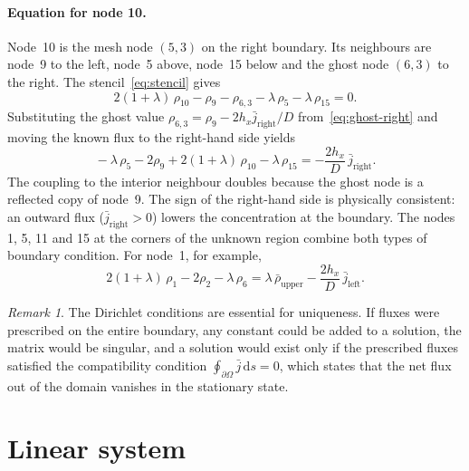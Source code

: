 \documentclass[11pt,a4paper]{article}
\numberwithin{equation}{section}
\theoremstyle{definition}
\theoremstyle{remark}
\newtheorem{remark}{Remark}[section]
\newcommand{\rhoUpper}{\bar{\rho}_{\mathrm{upper}}}
\newcommand{\jleft}{\bar{j}_{\mathrm{left}}}
\newcommand{\jright}{\bar{j}_{\mathrm{right}}}
\begin{document}
\paragraph{Equation for node 10.} Node~10 is the mesh node $(5,3)$ on the right boundary.
Its neighbours are node~9 to the left, node~5 above, node~15 below and the ghost node
$(6,3)$ to the right. The stencil~\eqref{eq:stencil} gives
\begin{equation}\label{eq:node10-raw}
  2(1 + \lambda)\,\rho_{10} - \rho_9 - \rho_{6,3} - \lambda\,\rho_5 - \lambda\,\rho_{15} = 0.
\end{equation}
Substituting the ghost value $\rho_{6,3} = \rho_9 - 2h_x\jright/D$
from~\eqref{eq:ghost-right} and moving the known flux to the right-hand side yields
\begin{equation}\label{eq:node10}
  \boxed{\;
    -\lambda\,\rho_5 - 2\rho_9 + 2(1 + \lambda)\,\rho_{10} - \lambda\,\rho_{15}
    = -\frac{2h_x}{D}\,\jright.
  \;}
\end{equation}
The coupling to the interior neighbour doubles because the ghost node is a reflected copy
of node~9. The sign of the right-hand side is physically consistent: an outward flux
($\jright > 0$) lowers the concentration at the boundary. The nodes 1, 5, 11 and 15 at the
corners of the unknown region combine both types of boundary condition. For node~1, for
example,
\begin{equation}\label{eq:node1}
  2(1 + \lambda)\,\rho_1 - 2\rho_2 - \lambda\,\rho_6
  = \lambda\,\rhoUpper - \frac{2h_x}{D}\,\jleft.
\end{equation}

\begin{remark}\label{rem:pureneumann}
  The Dirichlet conditions are essential for uniqueness. If fluxes were prescribed on the
  entire boundary, any constant could be added to a solution, the matrix would be
  singular, and a solution would exist only if the prescribed fluxes satisfied the
  compatibility condition $\oint_{\partial\Omega}\bar{j}\,\mathrm{d}s = 0$, which states
  that the net flux out of the domain vanishes in the stationary state.
\end{remark}

\section{Linear system}\label{sec:system}
\end{document}
